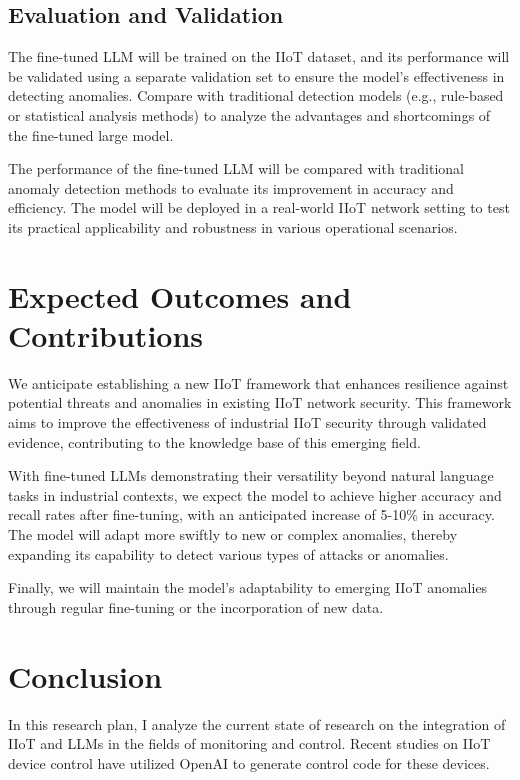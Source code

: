 \documentclass[usenatbib]{tjaa}
\begin{document}
\subsection{Evaluation and Validation}

The fine-tuned LLM will be trained on the IIoT dataset, and its performance will be
validated using a separate validation set to ensure the model's effectiveness in detecting anomalies.
Compare with traditional detection models (e.g., rule-based or statistical analysis methods) to analyze
the advantages and shortcomings of the fine-tuned large model.

The performance of the fine-tuned LLM will be compared with traditional anomaly detection methods to
evaluate its improvement in accuracy and efficiency.
The model will be deployed in a real-world IIoT network setting to test its practical
applicability and robustness in various operational scenarios.

\section{Expected Outcomes and Contributions}
\label{sec:outcomes}
We anticipate establishing a new IIoT framework that enhances resilience against
potential threats and anomalies in existing IIoT network security.
This framework aims to improve the effectiveness of industrial IIoT
security through validated evidence, contributing to the knowledge
base of this emerging field.

With fine-tuned LLMs demonstrating their versatility beyond
natural language tasks in industrial contexts, we expect the model
to achieve higher accuracy and recall rates after fine-tuning,
with an anticipated increase of 5-10\% in accuracy.
The model will adapt more swiftly to new or complex anomalies,
thereby expanding its capability to detect various types of
attacks or anomalies.

Finally, we will maintain the model’s adaptability to
emerging IIoT anomalies through regular fine-tuning or
the incorporation of new data.

\section{Conclusion}
\label{sec:conclusion}
In this research plan, I analyze the current state of research on the integration
of IIoT and LLMs in the fields of monitoring and control.
Recent studies on IIoT device control have utilized OpenAI
to generate control code for these devices.
\end{document}
